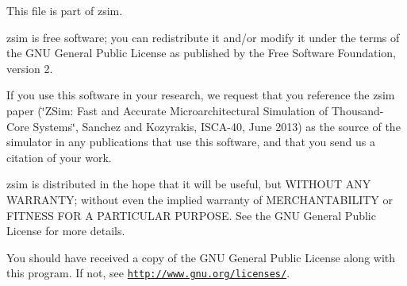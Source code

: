 This file is part of zsim.

zsim is free software; you can redistribute it and/or modify it under the terms of the G\-N\-U General Public License as published by the Free Software Foundation, version 2.

If you use this software in your research, we request that you reference the zsim paper (\char`\"{}\-Z\-Sim\-: Fast and Accurate Microarchitectural Simulation of
\-Thousand-\/\-Core Systems\char`\"{}, Sanchez and Kozyrakis, I\-S\-C\-A-\/40, June 2013) as the source of the simulator in any publications that use this software, and that you send us a citation of your work.

zsim is distributed in the hope that it will be useful, but W\-I\-T\-H\-O\-U\-T A\-N\-Y W\-A\-R\-R\-A\-N\-T\-Y; without even the implied warranty of M\-E\-R\-C\-H\-A\-N\-T\-A\-B\-I\-L\-I\-T\-Y or F\-I\-T\-N\-E\-S\-S F\-O\-R A P\-A\-R\-T\-I\-C\-U\-L\-A\-R P\-U\-R\-P\-O\-S\-E. See the G\-N\-U General Public License for more details.

You should have received a copy of the G\-N\-U General Public License along with this program. If not, see \href{http://www.gnu.org/licenses/}{\tt http\-://www.\-gnu.\-org/licenses/}. 